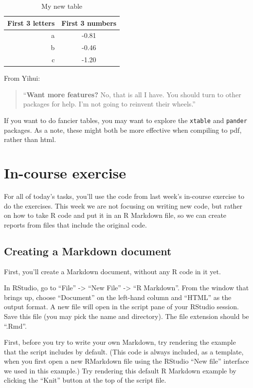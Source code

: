 \documentclass[]{book}
\theoremstyle{definition}
\theoremstyle{definition}
\theoremstyle{definition}
\theoremstyle{remark}
\begin{document}
\begin{table}

\caption{\label{tab:unnamed-chunk-320}My new table}
\centering
\begin{tabular}[t]{r|c}
\hline
First 3 letters & First 3 numbers\\
\hline
a & -0.81\\
\hline
b & -0.46\\
\hline
c & -1.20\\
\hline
\end{tabular}
\end{table}

From Yihui:

\begin{quote}
``\textbf{Want more features?} No, that is all I have. You should turn
to other packages for help. I'm not going to reinvent their wheels.''
\end{quote}

If you want to do fancier tables, you may want to explore the
\texttt{xtable} and \texttt{pander} packages. As a note, these might
both be more effective when compiling to pdf, rather than html.

\section{In-course exercise}\label{in-course-exercise-4}

For all of today's tasks, you'll use the code from last week's in-course
exercise to do the exercises. This week we are not focusing on writing
new code, but rather on how to take R code and put it in an R Markdown
file, so we can create reports from files that include the original
code.

\subsection{Creating a Markdown
document}\label{creating-a-markdown-document}

First, you'll create a Markdown document, without any R code in it yet.

In RStudio, go to ``File'' -\textgreater{} ``New File'' -\textgreater{}
``R Markdown''. From the window that brings up, choose ``Document'' on
the left-hand column and ``HTML'' as the output format. A new file will
open in the script pane of your RStudio session. Save this file (you may
pick the name and directory). The file extension should be ``.Rmd''.

First, before you try to write your own Markdown, try rendering the
example that the script includes by default. (This code is always
included, as a template, when you first open a new RMarkdown file using
the RStudio ``New file'' interface we used in this example.) Try
rendering this default R Markdown example by clicking the ``Knit''
button at the top of the script file.
\end{document}

